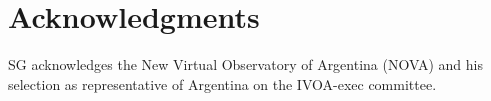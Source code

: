 \documentclass[final,5p,times,twocolumn,authoryear]{elsarticle}
\begin{document}
\section{Acknowledgments}
SG acknowledges the New Virtual Observatory of Argentina (NOVA) and his selection as representative of Argentina on the IVOA-exec committee.

%


\end{document}
